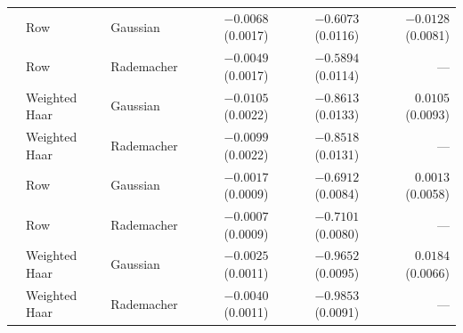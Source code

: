 \begin{tabular}{@{}rllrrr@{}}
\addlinespace[3pt]
256 & Row & Gaussian & $\mathbf{-0.0068}$ (0.0017) & $\mathbf{-0.6073}$ (0.0116) & $-0.0128$ (0.0081) \\
 & Row & Rademacher & $\mathbf{-0.0049}$ (0.0017) & $\mathbf{-0.5894}$ (0.0114) & --- \\
 & Weighted Haar & Gaussian & $\mathbf{-0.0105}$ (0.0022) & $\mathbf{-0.8613}$ (0.0133) & $0.0105$ (0.0093) \\
 & Weighted Haar & Rademacher & $\mathbf{-0.0099}$ (0.0022) & $\mathbf{-0.8518}$ (0.0131) & --- \\
\addlinespace[3pt]
512 & Row & Gaussian & $\mathbf{-0.0017}$ (0.0009) & $\mathbf{-0.6912}$ (0.0084) & $0.0013$ (0.0058) \\
 & Row & Rademacher & $-0.0007$ (0.0009) & $\mathbf{-0.7101}$ (0.0080) & --- \\
 & Weighted Haar & Gaussian & $\mathbf{-0.0025}$ (0.0011) & $\mathbf{-0.9652}$ (0.0095) & $\mathbf{0.0184}$ (0.0066) \\
 & Weighted Haar & Rademacher & $\mathbf{-0.0040}$ (0.0011) & $\mathbf{-0.9853}$ (0.0091) & --- \\
\bottomrule
\end{tabular}
